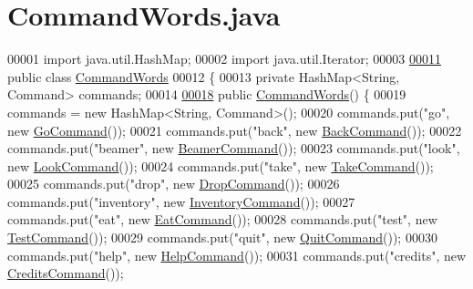 \hypertarget{CommandWords_8java_source}{\section{Command\-Words.\-java}
}

\begin{DoxyCode}
00001 \textcolor{keyword}{import} java.util.HashMap;
00002 \textcolor{keyword}{import} java.util.Iterator;
00003 
\hypertarget{CommandWords_8java_source_l00011}{}\hyperlink{classCommandWords}{00011} \textcolor{keyword}{public} \textcolor{keyword}{class }\hyperlink{classCommandWords}{CommandWords}
00012 \{
00013     \textcolor{keyword}{private} HashMap<String, Command> commands;
00014 
\hypertarget{CommandWords_8java_source_l00018}{}\hyperlink{classCommandWords_a2d8c096723adb3f822cc001bccd92ed7}{00018}     \textcolor{keyword}{public} \hyperlink{classCommandWords_a2d8c096723adb3f822cc001bccd92ed7}{CommandWords}() \{
00019         commands = \textcolor{keyword}{new} HashMap<String, Command>();
00020         commands.put(\textcolor{stringliteral}{"go"}, \textcolor{keyword}{new} \hyperlink{classGoCommand}{GoCommand}());
00021         commands.put(\textcolor{stringliteral}{"back"}, \textcolor{keyword}{new} \hyperlink{classBackCommand}{BackCommand}());
00022         commands.put(\textcolor{stringliteral}{"beamer"}, \textcolor{keyword}{new} \hyperlink{classBeamerCommand}{BeamerCommand}());
00023         commands.put(\textcolor{stringliteral}{"look"}, \textcolor{keyword}{new} \hyperlink{classLookCommand}{LookCommand}());
00024         commands.put(\textcolor{stringliteral}{"take"}, \textcolor{keyword}{new} \hyperlink{classTakeCommand}{TakeCommand}());
00025         commands.put(\textcolor{stringliteral}{"drop"}, \textcolor{keyword}{new} \hyperlink{classDropCommand}{DropCommand}());
00026         commands.put(\textcolor{stringliteral}{"inventory"}, \textcolor{keyword}{new} \hyperlink{classInventoryCommand}{InventoryCommand}());
00027         commands.put(\textcolor{stringliteral}{"eat"}, \textcolor{keyword}{new} \hyperlink{classEatCommand}{EatCommand}());
00028         commands.put(\textcolor{stringliteral}{"test"}, \textcolor{keyword}{new} \hyperlink{classTestCommand}{TestCommand}());
00029         commands.put(\textcolor{stringliteral}{"quit"}, \textcolor{keyword}{new} \hyperlink{classQuitCommand}{QuitCommand}());
00030         commands.put(\textcolor{stringliteral}{"help"}, \textcolor{keyword}{new} \hyperlink{classHelpCommand}{HelpCommand}());
00031         commands.put(\textcolor{stringliteral}{"credits"}, \textcolor{keyword}{new} \hyperlink{classCreditsCommand}{CreditsCommand}());

\end{DoxyCode}
